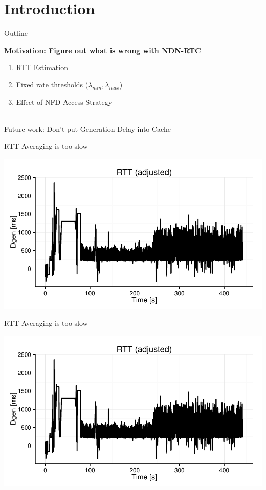 \section{Introduction}

\begin{frame}{Outline}
	
	
	
	\large
\textbf{Motivation: Figure out what is wrong with NDN-RTC
}
~\\
	\begin{enumerate}
		\item RTT Estimation
		\item Fixed rate thresholds ($\lambda_{min}, \lambda_{max}$)
		\item Effect of NFD Access Strategy
	\end{enumerate}
	~\\
	
	Future work: Don't put Generation Delay into Cache
	
\end{frame}


\begin{frame}{RTT Averaging is too slow}
	
	\includegraphics[width=\linewidth,page=1]{images/test8_1.pdf}
	
\end{frame}

\begin{frame}{RTT Averaging is too slow}
	
	\includegraphics[width=\linewidth,page=2]{images/test8_1.pdf}
	
\end{frame}

